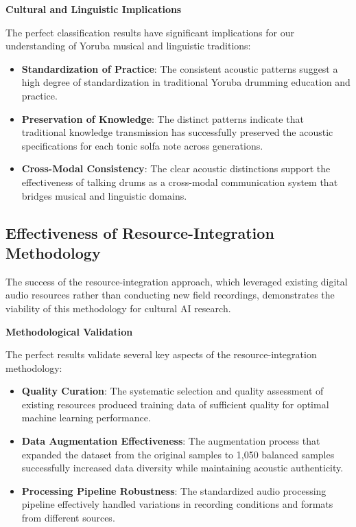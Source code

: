 \documentclass[12pt,a4paper]{article}
\begin{document}
\textbf{Cultural and Linguistic Implications}

The perfect classification results have significant implications for our understanding of Yoruba musical and linguistic traditions:

\begin{itemize}
\item \textbf{Standardization of Practice}: The consistent acoustic patterns suggest a high degree of standardization in traditional Yoruba drumming education and practice.
\item \textbf{Preservation of Knowledge}: The distinct patterns indicate that traditional knowledge transmission has successfully preserved the acoustic specifications for each tonic solfa note across generations.
\item \textbf{Cross-Modal Consistency}: The clear acoustic distinctions support the effectiveness of talking drums as a cross-modal communication system that bridges musical and linguistic domains.
\end{itemize}

\subsection{Effectiveness of Resource-Integration Methodology}

The success of the resource-integration approach, which leveraged existing digital audio resources rather than conducting new field recordings, demonstrates the viability of this methodology for cultural AI research.

\textbf{Methodological Validation}

The perfect results validate several key aspects of the resource-integration methodology:

\begin{itemize}
\item \textbf{Quality Curation}: The systematic selection and quality assessment of existing resources produced training data of sufficient quality for optimal machine learning performance.
\item \textbf{Data Augmentation Effectiveness}: The augmentation process that expanded the dataset from the original samples to 1,050 balanced samples successfully increased data diversity while maintaining acoustic authenticity.
\item \textbf{Processing Pipeline Robustness}: The standardized audio processing pipeline effectively handled variations in recording conditions and formats from different sources.
\end{itemize}
\end{document}
